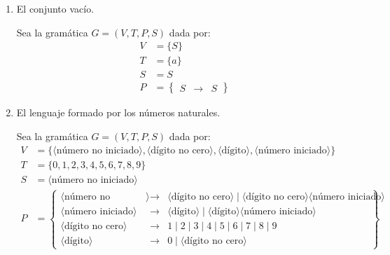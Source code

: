 \begin{ejercicio}
\begin{enumerate}
        \item El conjunto vacío.
        
        Sea la gramática $G=\left(V,T,P,S\right)$ dada por:
        \begin{align*}
            V &= \{S\} \\
            T &= \{a\} \\
            S &= S \\
            P &= \left\{
                \begin{array}{rcl}
                    S &\rightarrow & S
                \end{array}
            \right\}
        \end{align*}

        \item El lenguaje formado por los números naturales.
        
        Sea la gramática $G=\left(V,T,P,S\right)$ dada por:
        \begin{align*}
            V &= \{\langle \text{número no iniciado} \rangle, \langle \text{dígito no cero} \rangle, \langle \text{dígito} \rangle, \langle \text{número iniciado} \rangle\} \\
            T &= \{0,1,2,3,4,5,6,7,8,9\} \\
            S &= \langle \text{número no iniciado} \rangle \\
            P &= \left\{
                \begin{array}{rcl}
                    \langle \text{número no iniciado} \rangle &\rightarrow & \langle \text{dígito no cero} \rangle \mid \langle \text{dígito no cero} \rangle \langle \text{número iniciado} \rangle \\
                    \langle \text{número iniciado} \rangle &\rightarrow & \langle \text{dígito} \rangle \mid \langle \text{dígito} \rangle \langle \text{número iniciado} \rangle \\
                    \langle \text{dígito no cero} \rangle &\rightarrow & 1 \mid 2 \mid 3 \mid 4 \mid 5 \mid 6 \mid 7 \mid 8 \mid 9 \\
                    \langle \text{dígito} \rangle &\rightarrow & 0 \mid \langle \text{dígito no cero} \rangle
                \end{array}
            \right\}
        \end{align*}


\end{enumerate}
\end{ejercicio}
